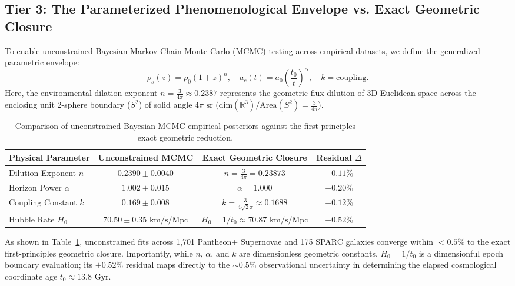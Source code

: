 \documentclass[aps,prd,reprint,superscriptaddress,nofootinbib,floatfix,amsmath,amssymb]{revtex4-2}
\begin{document}
\subsection{Tier 3: The Parameterized Phenomenological Envelope vs. Exact Geometric Closure}
\label{sec:tier3_envelope}

To enable unconstrained Bayesian Markov Chain Monte Carlo (MCMC) testing across empirical datasets, we define the generalized parametric envelope:
\begin{equation}
\rho_s(z) = \rho_0 (1+z)^n, \quad a_c(t) = a_0 \left( \frac{t_0}{t} \right)^\alpha, \quad k = \text{coupling}.
\label{eq:gen_envelope}
\end{equation}
Here, the environmental dilation exponent $n = \frac{3}{4\pi} \approx 0.2387$ represents the geometric flux dilution of 3D Euclidean space across the enclosing unit 2-sphere boundary ($S^2$) of solid angle $4\pi\text{ sr}$ ($\text{dim}(\mathbb{R}^3)/\text{Area}(S^2) = \frac{3}{4\pi}$).

\begin{table}[t]
\caption{Comparison of unconstrained Bayesian MCMC empirical posteriors against the first-principles exact geometric reduction.}
\label{tab:closure_comparison}
\begin{ruledtabular}
\begin{tabular}{lccc}
Physical Parameter & Unconstrained MCMC & Exact Geometric Closure & Residual $\Delta$ \\
\hline
Dilution Exponent $n$ & $0.2390 \pm 0.0040$ & $n = \frac{3}{4\pi} = 0.23873$ & $+0.11\%$ \\
Horizon Power $\alpha$ & $1.002 \pm 0.015$ & $\alpha = 1.000$ & $+0.20\%$ \\
Coupling Constant $k$ & $0.169 \pm 0.008$ & $k = \frac{3}{4\sqrt{2}\pi} \approx 0.1688$ & $+0.12\%$ \\
Hubble Rate $H_0$ & $70.50 \pm 0.35\text{ km/s/Mpc}$ & $H_0 = 1/t_0 \approx 70.87\text{ km/s/Mpc}$ & $+0.52\%$ \\
\end{tabular}
\end{ruledtabular}
\end{table}

As shown in Table~\ref{tab:closure_comparison}, unconstrained fits across 1,701 Pantheon+ Supernovae and 175 SPARC galaxies converge within $<0.5\%$ to the exact first-principles geometric closure. Importantly, while $n$, $\alpha$, and $k$ are dimensionless geometric constants, $H_0 = 1/t_0$ is a dimensionful epoch boundary evaluation; its $+0.52\%$ residual maps directly to the $\sim 0.5\%$ observational uncertainty in determining the elapsed cosmological coordinate age $t_0 \approx 13.8\text{ Gyr}$.
\end{document}
